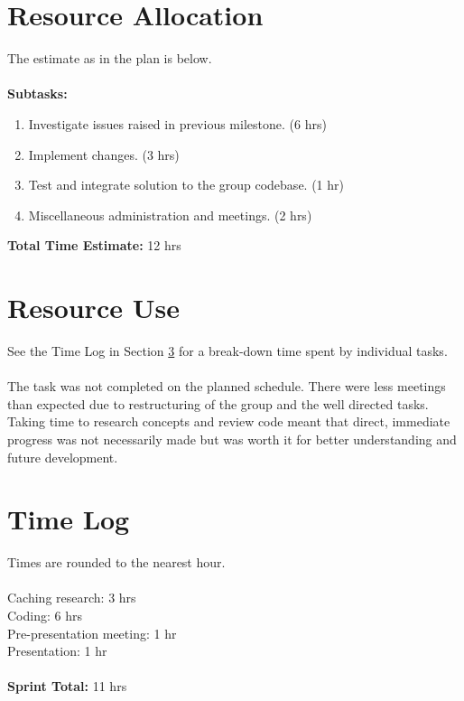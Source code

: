 \documentclass[10pt, a4]{article}
\begin{document}
\section{Resource Allocation}
The estimate as in the plan is below.\\
\\
\textbf{Subtasks:}
\begin{enumerate}
	\item Investigate issues raised in previous milestone. (6 hrs)
	\item Implement changes. (3 hrs)
	\item Test and integrate solution to the group codebase. (1 hr)
	\item Miscellaneous administration and meetings. (2 hrs)
\end{enumerate}
\textbf{Total Time Estimate:} 12 hrs

\section{Resource Use}
See the Time Log in Section \ref{time-log} for a break-down time spent by individual tasks.\\
\\
The task was not completed on the planned schedule. There were less meetings than expected due to restructuring of the group and the well directed tasks. Taking time to research concepts and review code meant that direct, immediate progress was not necessarily made but was worth it for better understanding and future development.

\section{Time Log}
\label{time-log}
Times are rounded to the nearest hour.\\
\\
Caching research: 3 hrs\\
Coding: 6 hrs\\
Pre-presentation meeting: 1 hr\\
Presentation: 1 hr\\
\\
\textbf{Sprint Total:} 11 hrs%
\end{document}
